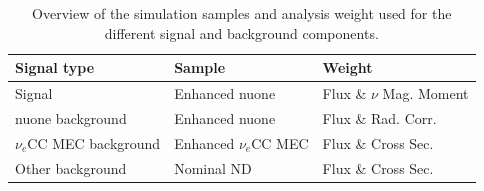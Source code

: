 \begin{table}[!ht]
\centering
\caption{Overview of the simulation samples and analysis weight used for the different signal and background components.}
\def\arraystretch{1.4}
\begin{tabular}{l@{\hskip 1cm}l@{\hskip 1cm}l}
Signal type            & Sample               & Weight\\\hline
Signal                 & Enhanced \gls{nuone} & Flux \& $\nu$ Mag. Moment\\
\gls{nuone} background & Enhanced \gls{nuone} & Flux \& Rad. Corr.\\
$\nu_e$\gls{CC} \gls{MEC} background & Enhanced $\nu_e$\gls{CC} \gls{MEC} & Flux \& Cross Sec.\\
Other background       & Nominal \gls{ND}     & Flux \& Cross Sec.
\end{tabular}
\label{tab:NuMMSamplesAndWeightsOverview}
\end{table}